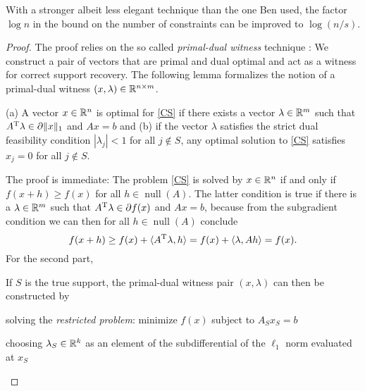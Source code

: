 \documentclass{article} %
\renewcommand{\null}{\operatorname{null}}
\begin{document}
With a stronger albeit less elegant technique than the one Ben used, the factor $\log n$ in the bound on the number of constraints can be improved to $\log(n/s)$.
\begin{proof}
The proof relies on the so called \emph{primal-dual witness} technique \cite{Wainwright2009}: We construct a pair of vectors that are primal and dual optimal and act as a witness for correct support recovery.
The following lemma formalizes the notion of a primal-dual witness $(x, \lambda)\in \mathbb{R}^{n\times m}$.
\begin{lemma}
  (a) A vector $x \in \mathbb{R}^n$ is optimal for \eqref{CS} if there exists
  a vector $\lambda\in \mathbb{R}^m$ such that $A^{\rm T} \lambda\in \partial
  \lVert x\rVert_1$ and $Ax = b$ and (b) if the vector $\lambda$
  satisfies the strict dual feasibility condition $|\lambda_j| < 1$
  for all $j\not\in S$, any optimal solution to \eqref{CS} satisfies
  $x_j = 0$ for all $j\not\in S$.
\end{lemma}
The proof is immediate: The problem \eqref{CS} is solved by $x\in
\mathbb{R}^n$ if and only if $f(x + h) \geq f(x)$ for all $h\in \null(A)$.
The latter condition is true if there is a $\lambda \in \mathbb{R}^m$ such
that $A^{\rm T} \lambda \in \partial f(x)$ and $Ax = b$, because from
the subgradient condition we can then for all $h\in \null(A)$ conclude
\begin{equation*}
f(x + h) \geq f(x) + \langle A^{\rm T} \lambda, h\rangle = f(x) +
  \langle\lambda, A h\rangle = f(x).
\end{equation*}
For the second part,

If $S$ is the true support, the primal-dual witness pair $(x, \lambda)$ can then be constructed by
\begin{compactenum}
  \item solving the \emph{restricted problem}: minimize $f(x)$ subject
    to $A_S x_S = b$
  \item choosing $\lambda_S \in \mathbb{R}^k$ as an element of the
    subdifferential of the $\ell_1$ norm evaluated at $x_S$
  \item 
\end{compactenum}


\end{proof}
\end{document}
